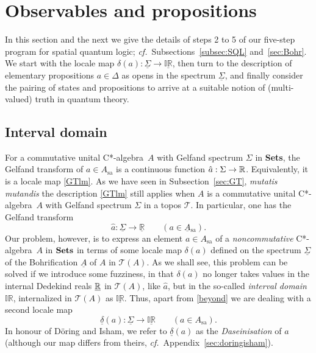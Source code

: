 \documentclass[12pt]{article}
\newcommand{\IR}{\mathbb{IR}}
\newcommand{\uIR}{\underline{\mathbb{IR}}}
\newcommand{\beq}{\begin{equation}}
\newcommand{\eeq}{\end{equation}}
\newcommand{\Sets}{\mbox{\textbf{Sets}}}
\newcommand{\ca}{C*-algebra} \newcommand{\jba}{JB-algebra}
\newcommand{\raw}{\rightarrow} \newcommand{\rat}{\mapsto}
\newcommand{\er}{\eqref}
\newcommand{\dl}{\delta} \newcommand{\Dl}{\Delta}
\newcommand{\Sg}{\Sigma} \newcommand{\ta}{\tau} \newcommand{\ph}{\phi}
\newcommand{\CT}{{\mathcal T}} \newcommand{\CV}{{\mathcal V}}
\newcommand{\alg}[1]{\ensuremath{#1}}
\newcommand{\functor}[1]{\ensuremath{\underline{#1}}}
\newcommand{\asstopos}{\ensuremath{\mathcal{T}}}
\newcommand{\sa}{\ensuremath{_{\mathrm{sa}}}}
\newcommand{\uA}{\underline{A}}
\newcommand{\TA}{\mathcal{T}(A)}
\newcommand{\ulS}{\functor{\Sigma}}
\newcommand{\ulR}{\underline{\mathbb{R}}}
\renewcommand{\TA}{\asstopos(\alg{A})}
\begin{document}
\section{Observables and propositions}
\label{sec:interpretationofquantumphysics}

In this section and the next we give the details of  steps 2 to 5 of
our five-step program for spatial quantum logic; {\it cf.}\
Subsections~\ref{subsec:SQL} and~\ref{sec:Bohr}. We start with the
locale map  $\dl(a):\ulS\raw\uIR$, then turn to the description of
elementary propositions $a\in\Dl$ as opens in the spectrum $\ulS$, and
finally consider the pairing of states and propositions to arrive at a
suitable notion of (multi-valued) truth in quantum theory.

\subsection{Interval domain}\label{subsec:ID}

For a commutative unital \ca\ $A$ with Gelfand spectrum $\Sg$ in
\Sets, the Gelfand transform of $a\in A\sa$ is a continuous function
$\hat{a}:\Sg\raw\R$. Equivalently, it is a locale map \er{GTlm}. As we
have seen  in Subsection~\ref{sec:GT}, {\it mutatis mutandis} the
description \er{GTlm} still applies when $A$ is a commutative unital
\ca\ $A$ with Gelfand spectrum $\Sg$  in a topos $\CT$. In particular,
one has the Gelfand transform
\beq
  \hat{a}:  \ulS\raw \ulR \qquad (a\in \uA\sa).\label{beyond}
\eeq
Our problem, however, is to express an element $a\in A\sa$ of a {\it
noncommutative} \ca\ $A$ in $\Sets$ in terms of some locale map
$\dl(a)$ defined on the spectrum $\ulS$ of the Bohrification $\uA$
of $A$ in $\TA$. As we shall see, this problem can be solved if we
introduce some fuzziness, in that $\dl(a)$ no longer takes values
in the internal Dedekind reals $\underline{{\mathbb R}}$ in $\TA$, like
$\hat{a}$, but in the so-called {\it interval domain} $\IR$,
internalized in $\TA$ as $\underline{\IR}$. Thus, apart from
\er{beyond} we are dealing with a second locale map
\beq
\underline{\dl}(a):  \ulS\raw \underline{\IR} \qquad (a\in A\sa).\label{Da1}
\eeq
In honour of D\"{o}ring and Isham, we refer to $\underline{\dl}(a)$ as the {\it
Daseinisation} of $a$ (although our map differs from theirs, {\it
cf.}\ Appendix~\ref{sec:doringisham}).
\end{document}
